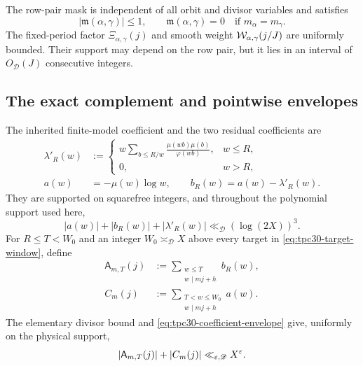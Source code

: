 The row-pair mask is independent of all orbit and divisor variables
and satisfies
\begin{equation}
 |\mathfrak m(\alpha,\gamma)|\le1,
 \qquad
 \mathfrak m(\alpha,\gamma)=0
 \quad\text{if }m_\alpha=m_\gamma.
 \label{eq:tpc30-row-mask}
\end{equation}
The fixed-period factor $\Xi_{\alpha,\gamma}(j)$ and smooth weight
$\mathcal W_{\alpha,\gamma}(j/J)$ are uniformly bounded.  Their support may
depend on the row pair, but it lies in an interval of
$O_{\mathscr D}(J)$ consecutive integers.

\subsection{The exact complement and pointwise envelopes}

The inherited finite-model coefficient and the two residual
coefficients are
\begin{align}
 \lambda'_R(w)
 &:={}
 \begin{cases}
  \displaystyle
  w\sum_{b\le R/w}\frac{\mu(wb)\mu(b)}{\varphi(wb)},&w\le R,\\[7pt]
  0,&w>R,
 \end{cases}
 \label{eq:tpc30-lambda-coefficient}\\
 a(w)&=-\mu(w)\log w,
 \qquad
 b_R(w)=a(w)-\lambda'_R(w).
 \label{eq:tpc30-divisor-coefficients}
\end{align}
They are supported on squarefree integers, and throughout the
polynomial support used here,
\begin{equation}
 |a(w)|+|b_R(w)|+|\lambda'_R(w)|
 \ll_{\mathscr D}(\log(2X))^3.
 \label{eq:tpc30-coefficient-envelope}
\end{equation}
For $R\le T<W_0$ and an integer
$W_0\asymp_{\mathscr D}X$ above every target in
\eqref{eq:tpc30-target-window}, define
\begin{align}
 \mathsf A_{m,T}(j)
 &:=\sum_{\substack{w\le T\\w\mid mj+h}}b_R(w),
 \label{eq:tpc30-raw-prefix}\\
 C_m(j)
 &:=\sum_{\substack{T<w\le W_0\\w\mid mj+h}}a(w).
 \label{eq:tpc30-ultra-complement}
\end{align}
The elementary divisor bound and
\eqref{eq:tpc30-coefficient-envelope} give, uniformly on the physical
support,
\begin{equation}
 |\mathsf A_{m,T}(j)|+|C_m(j)|
 \ll_{\varepsilon,\mathscr D}X^\varepsilon.
 \label{eq:tpc30-pointwise-envelope}
\end{equation}

